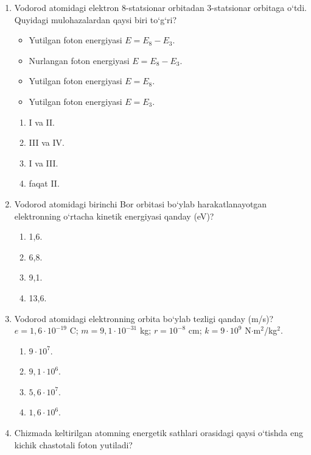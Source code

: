 \begin{enumerate}
\item Vodorod atomidagi elektron 8-statsionar orbitadan 3-statsionar orbitaga o‘tdi. Quyidagi mulohazalardan qaysi biri to‘g‘ri?
\begin{itemize}
    \item[I.] Yutilgan foton energiyasi $E = E_8 - E_3$.
    \item[II.] Nurlangan foton energiyasi $E = E_8 - E_3$.
    \item[III.] Yutilgan foton energiyasi $E = E_8$.
    \item[IV.] Yutilgan foton energiyasi $E = E_3$.
\end{itemize}
\begin{enumerate}[label=\Alph*)]
\item I va II.
\item III va IV.
\item I va III.
\item faqat II.
\end{enumerate}

\item Vodorod atomidagi birinchi Bor orbitasi bo‘ylab harakatlanayotgan elektronning o‘rtacha kinetik energiyasi qanday (eV)?
\begin{enumerate}[label=\Alph*)]
\item 1,6.
\item 6,8.
\item 9,1.
\item 13,6.
\end{enumerate}

\item Vodorod atomidagi elektronning orbita bo‘ylab tezligi qanday (m/s)? $e=1,6\cdot 10^{-19}$ C; $m=9,1\cdot 10^{-31}$ kg; $r=10^{-8}$ cm; $k=9\cdot 10^9$ N$\cdot$m$^2$/kg$^2$.
\begin{enumerate}[label=\Alph*)]
\item $9\cdot 10^7$.
\item $9,1\cdot 10^6$.
\item $5,6\cdot 10^7$.
\item $1,6\cdot 10^6$.
\end{enumerate}

\item Chizmada keltirilgan atomning energetik sathlari orasidagi qaysi o‘tishda eng kichik chastotali foton yutiladi?

\begin{center}
\end{center}
\end{enumerate}
